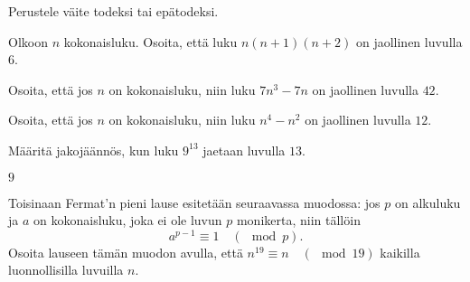 \begin{tehtava}
    Perustele väite todeksi tai epätodeksi.
    
    \begin{alakohdat}
    \end{alakohdat}
    
    \begin{vastaus}
    
        \begin{alakohdat}
        \end{alakohdat}
    \end{vastaus}
    
\end{tehtava}

\begin{tehtava}
    Olkoon $n$ kokonaisluku. Osoita, että luku $n(n+1)(n+2)$ on jaollinen luvulla $6$.
\end{tehtava}

\begin{tehtava}
    Osoita, että jos $n$ on kokonaisluku, niin luku $7n^3 - 7n$ on jaollinen luvulla $42$.
\end{tehtava}

\begin{tehtava}
    Osoita, että jos $n$ on kokonaisluku, niin luku $n^4 - n^2$ on jaollinen luvulla $12$.
\end{tehtava}

\begin{tehtava}
    Määritä jakojäännös, kun luku $9^{13}$ jaetaan luvulla $13$.
    
    \begin{vastaus}
        $9$
    \end{vastaus}
    
\end{tehtava}

\begin{tehtava}
    Toisinaan Fermat'n pieni lause esitetään seuraavassa
    muodossa:
    jos $p$ on alkuluku ja $a$ on kokonaisluku, joka ei ole
    luvun $p$ monikerta, niin tällöin
    \[
    a^{p-1}\equiv 1\quad (\mod p).
    \]
    Osoita lauseen tämän muodon avulla, että $n^{19}\equiv n \quad
    (\mod 19)$ kaikilla luonnollisilla luvuilla $n$.
\end{tehtava}

